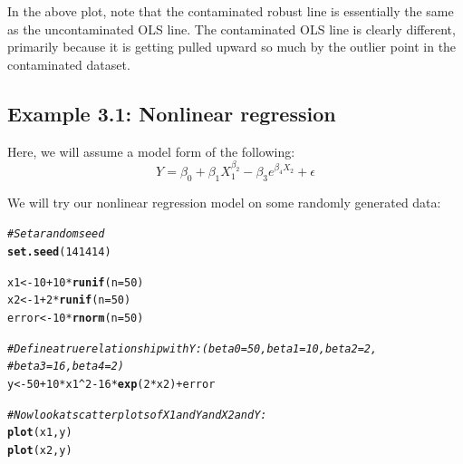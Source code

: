 \documentclass{article}\usepackage[]{graphicx}\usepackage[]{color}
\makeatletter
\newcommand{\hlnum}[1]{\textcolor[rgb]{0.686,0.059,0.569}{#1}}%
\newcommand{\hlcom}[1]{\textcolor[rgb]{0.678,0.584,0.686}{\textit{#1}}}%
\newcommand{\hlopt}[1]{\textcolor[rgb]{0,0,0}{#1}}%
\newcommand{\hlstd}[1]{\textcolor[rgb]{0.345,0.345,0.345}{#1}}%
\newcommand{\hlkwb}[1]{\textcolor[rgb]{0.69,0.353,0.396}{#1}}%
\newcommand{\hlkwc}[1]{\textcolor[rgb]{0.333,0.667,0.333}{#1}}%
\newcommand{\hlkwd}[1]{\textcolor[rgb]{0.737,0.353,0.396}{\textbf{#1}}}%
\newenvironment{kframe}{%
 \def\at@end@of@kframe{}%
 \ifinner\ifhmode%
  \def\at@end@of@kframe{\end{minipage}}%
  \begin{minipage}{\columnwidth}%
 \fi\fi%
 \def\FrameCommand##1{\hskip\@totalleftmargin \hskip-\fboxsep
 \colorbox{shadecolor}{##1}\hskip-\fboxsep
     \hskip-\linewidth \hskip-\@totalleftmargin \hskip\columnwidth}%
 \MakeFramed {\advance\hsize-\width
   \@totalleftmargin\z@ \linewidth\hsize
   \@setminipage}}%
 {\par\unskip\endMakeFramed%
 \at@end@of@kframe}
\newenvironment{knitrout}{}{} %
\makeatother
\begin{document}
In the above plot, note that the contaminated robust line is essentially the same as the uncontaminated OLS line. The contaminated OLS line is clearly different, primarily because it is getting pulled upward so much by the outlier point in the contaminated dataset.

\newpage

\subsection*{Example 3.1: Nonlinear regression}

Here, we will assume a model form of the following:
\[Y = \beta_0 + \beta_1 X_1^{\beta_2} - \beta_3 e^{\beta_4 X_2} + \epsilon\]

We will try our nonlinear regression model on some randomly generated data:
\begin{knitrout}
\color{fgcolor}\begin{kframe}
\begin{alltt}
\hlcom{# Set a random seed}
\hlkwd{set.seed}\hlstd{(}\hlnum{141414}\hlstd{)}

\hlstd{x1} \hlkwb{<-} \hlnum{10} \hlopt{+} \hlnum{10}\hlopt{*}\hlkwd{runif}\hlstd{(}\hlkwc{n} \hlstd{=} \hlnum{50}\hlstd{)}
\hlstd{x2} \hlkwb{<-} \hlnum{1} \hlopt{+} \hlnum{2}\hlopt{*}\hlkwd{runif}\hlstd{(}\hlkwc{n} \hlstd{=} \hlnum{50}\hlstd{)}
\hlstd{error} \hlkwb{<-} \hlnum{10}\hlopt{*}\hlkwd{rnorm}\hlstd{(}\hlkwc{n} \hlstd{=} \hlnum{50}\hlstd{)}

\hlcom{# Define a true relationship with Y: (beta0 = 50, beta1 = 10, beta2 = 2,}
\hlcom{# beta3 = 16, beta4 = 2)}
\hlstd{y} \hlkwb{<-} \hlnum{50} \hlopt{+} \hlnum{10}\hlopt{*}\hlstd{x1}\hlopt{^}\hlnum{2} \hlopt{-} \hlnum{16}\hlopt{*}\hlkwd{exp}\hlstd{(}\hlnum{2}\hlopt{*}\hlstd{x2)} \hlopt{+} \hlstd{error}

\hlcom{# Now look at scatterplots of X1 and Y and X2 and Y:}
\hlkwd{plot}\hlstd{(x1, y)}
\hlkwd{plot}\hlstd{(x2, y)}
\end{alltt}
\end{kframe}


\end{knitrout}
\end{document}
